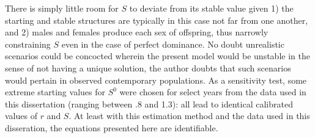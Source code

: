   There is simply little room for $S$ to deviate from its stable value given 
  1) the starting and stable structures are typically in this
  case not far from one another, and 2) males and females produce each sex of
  offspring, thus narrowly constraining $S$ even in the case of
  perfect dominance. No doubt unrealistic scenarios could be concocted wherein
  the present model would be unstable in the sense of not having a unique 
  solution, the author doubts that
  such scenarios would pertain in observed contemporary populations. As a
  sensitivity test, some extreme starting values for $S^0$ were chosen for
  select years from the data used in this dissertation (ranging between .8 and
  1.3): all lead to identical calibrated values of $r$ and $S$. At least with
  this estimation method and the data used in this disseration, the equations
  presented here are identifiable.
